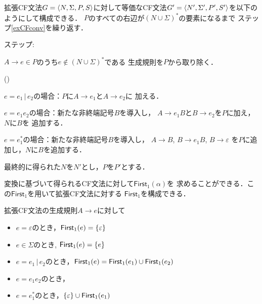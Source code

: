 \documentclass[dvipdfmx,a4j]{jbook}
\newcounter{coffee}
\newcounter{bean}
\begin{document}
\begin{Alg}
  拡張CF文法$G=\langle{N,\Sigma,P,S}\rangle$に対して等価なCF文法$G'=
  \langle{N',\Sigma',P',S'}\rangle$を以下のようにして構成できる．
  $P$のすべての右辺が$(N\cup\Sigma)^\ast$の要素になるまで
  ステップ\ref{exCFconv}を繰り返す．
  \begin{list}{ステップ:}{}
    \item\label{exCFconv} $A\rightarrow e\in P$のうち$e\notin(N\cup\Sigma)^\ast$である
    生成規則を$P$から取り除く．
    \begin{list}{()}{}
      \item $e=e_1\,|\,e_2$の場合：$P$に$A\rightarrow e_1$と$A\rightarrow e_2$に
      加える．
      \item $e=e_1e_2$の場合：新たな非終端記号$B$を導入し，
      $A\rightarrow e_1B$と$B\rightarrow e_2$を$P$に加え，$N$に$B$を
      追加する．
      \item $e=e_1^\ast$の場合：新たな非終端記号$B$を導入し，
      $A\rightarrow B$, $B\rightarrow e_1B$, $B\rightarrow\varepsilon$
      を$P$に追加し，$N$に$B$を追加する．
    \end{list}
  \end{list}
  最終的に得られた$N$を$N'$とし，$P$を$P'$とする．
\end{Alg}

変換に基づいて得られるCF文法に対して$\mathsf{First}_1(\alpha)$を
求めることができる．この$\mathsf{First}_1$を用いて拡張CF文法に対する
$\mathsf{First}_1$を構成できる．

\begin{Def}
  拡張CF文法の生成規則$A\rightarrow e$に対して
  \begin{itemize}
    \item $e=\varepsilon$のとき，$\mathsf{First}_1({e})=\{\varepsilon\}$
    \item $e\in\Sigma$のとき, $\mathsf{First}_1({e})=\{e\}$
    \item $e=e_1\,|\,e_2$のとき，$\mathsf{First}_1({e})=\mathsf{First}_1({e_1})\cup\mathsf{First}_1({e_2})$
    \item $e=e_1 e_2$のとき，
    \item $e=e_1^\ast$のとき，$\{\varepsilon\}\cup\mathsf{First}_1({e_1})$
  \end{itemize}
\end{Def}
\end{document}
